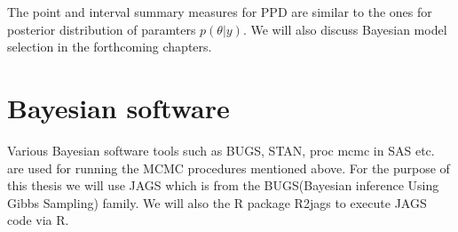 The point and interval summary measures for PPD are similar to the ones for posterior distribution of paramters $p(\theta|y)$. We will also discuss Bayesian model selection in the forthcoming chapters.

\section{Bayesian software}
Various Bayesian software tools such as BUGS, STAN, proc mcmc in SAS etc. are used for running the MCMC procedures mentioned above. For the purpose of this thesis we will use JAGS which is from the BUGS(Bayesian inference Using Gibbs Sampling) family. We will also the R package R2jags to execute JAGS code via R.
